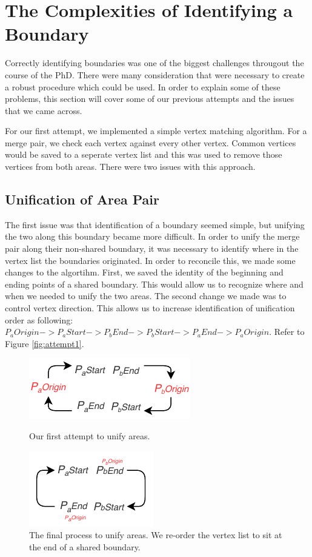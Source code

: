 \section{The Complexities of Identifying a Boundary} \label{sec:complex}
Correctly identifying boundaries was one of the biggest challenges througout the course of the PhD. There were many consideration that were necessary to create a robust procedure which could be used. In order to explain some of these problems, this section will cover some of our previous attempts and the issues that we came across. 

For our first attempt, we implemented a simple vertex matching algorithm. For a merge pair, we check each vertex against every other vertex. Common vertices would be saved to a seperate vertex list and this was used to remove those vertices from both areas. There were two issues with this approach.

\subsection{Unification of Area Pair}

The first issue was that identification of a boundary seemed simple, but unifying the two along this boundary became more difficult. In order to unify the merge pair along their non-shared boundary, it was necessary to identify where in the vertex list the boundaries originated. In order to reconcile this, we made some changes to the algortihm. First, we saved the identity of the beginning and ending points of a shared boundary. This would allow us to recognize where and when we needed to unify the two areas. The second change we made was to control vertex direction. This allows us to increase identification of unification order as following: $P_aOrigin->P_aStart->P_bEnd->P_bStart->P_aEnd->P_aOrigin$. Refer to Figure \ref{fig:attempt1}.
\begin{figure}[b]
\includegraphics[height=0.1\textheight]{images/ch6/attempt1p}
\caption{Our first attempt to unify areas.} \label{fig:attempt1}
\includegraphics[height=0.15\textheight]{images/ch6/attempt2p}
\caption{The final process to unify areas. We re-order the vertex list to sit at the end of a shared boundary.} \label{fig:attempt2}
\end{figure}

